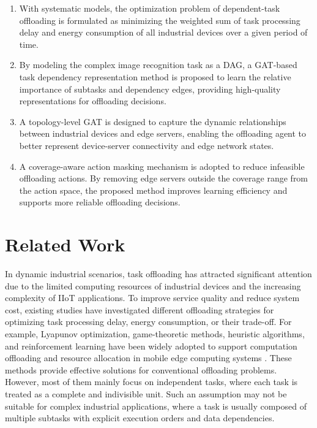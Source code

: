 \documentclass[conference]{IEEEtran}
\begin{document}
\begin{enumerate}
\item With systematic models, the optimization problem of dependent-task offloading is formulated as minimizing the weighted sum of task processing delay and energy consumption of all industrial devices over a given period of time.

\item By modeling the complex image recognition task as a DAG, a GAT-based task dependency representation method is proposed to learn the relative importance of subtasks and dependency edges, providing high-quality representations for offloading decisions.

\item A topology-level GAT is designed to capture the dynamic relationships between industrial devices and edge servers, enabling the offloading agent to better represent device-server connectivity and edge network states.

\item A coverage-aware action masking mechanism is adopted to reduce infeasible offloading actions. By removing edge servers outside the coverage range from the action space, the proposed method improves learning efficiency and supports more reliable offloading decisions.

\end{enumerate}

\section{Related Work}

In dynamic industrial scenarios, task offloading has attracted significant attention due to the limited computing resources of industrial devices and the increasing complexity of IIoT applications. To improve service quality and reduce system cost, existing studies have investigated different offloading strategies for optimizing task processing delay, energy consumption, or their trade-off. For example, Lyapunov optimization, game-theoretic methods, heuristic algorithms, and reinforcement learning have been widely adopted to support computation offloading and resource allocation in mobile edge computing systems \cite{8371267}. These methods provide effective solutions for conventional offloading problems. However, most of them mainly focus on independent tasks, where each task is treated as a complete and indivisible unit. Such an assumption may not be suitable for complex industrial applications, where a task is usually composed of multiple subtasks with explicit execution orders and data dependencies.
\end{document}
